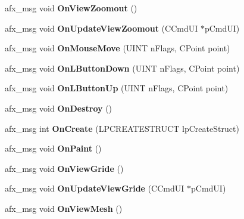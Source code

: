 \begin{DoxyCompactItemize}
afx\+\_\+msg void {\bfseries On\+View\+Zoomout} ()
\item 
\mbox{\label{class_work_view_a25b12d323ee4b426bba4b738d6b60cb8}} 
afx\+\_\+msg void {\bfseries On\+Update\+View\+Zoomout} (C\+Cmd\+UI $\ast$p\+Cmd\+UI)
\item 
\mbox{\label{class_work_view_a3408bfe423d38af42731966bc6b1b5f8}} 
afx\+\_\+msg void {\bfseries On\+Mouse\+Move} (U\+I\+NT n\+Flags, C\+Point point)
\item 
\mbox{\label{class_work_view_a251a6f512bd43f40a647517fb41eb68a}} 
afx\+\_\+msg void {\bfseries On\+L\+Button\+Down} (U\+I\+NT n\+Flags, C\+Point point)
\item 
\mbox{\label{class_work_view_ad66b49ccc4663eccbe9589a0754f9775}} 
afx\+\_\+msg void {\bfseries On\+L\+Button\+Up} (U\+I\+NT n\+Flags, C\+Point point)
\item 
\mbox{\label{class_work_view_aa7974658428c358313f8c5578c89665d}} 
afx\+\_\+msg void {\bfseries On\+Destroy} ()
\item 
\mbox{\label{class_work_view_affa363a468b358c178ab2feb5956c4e6}} 
afx\+\_\+msg int {\bfseries On\+Create} (L\+P\+C\+R\+E\+A\+T\+E\+S\+T\+R\+U\+CT lp\+Create\+Struct)
\item 
\mbox{\label{class_work_view_acf3b77c19540468ff5b385dc1d3a05d7}} 
afx\+\_\+msg void {\bfseries On\+Paint} ()
\item 
\mbox{\label{class_work_view_a4eaa90a69961395efbfeaa4773e0588f}} 
afx\+\_\+msg void {\bfseries On\+View\+Gride} ()
\item 
\mbox{\label{class_work_view_a86baee2b4009eea98833b3e98b352ae9}} 
afx\+\_\+msg void {\bfseries On\+Update\+View\+Gride} (C\+Cmd\+UI $\ast$p\+Cmd\+UI)
\item 
\mbox{\label{class_work_view_af3688036af8f371f405093e2f48fcc75}} 
afx\+\_\+msg void {\bfseries On\+View\+Mesh} ()
\item 
\mbox{\label{class_work_view_a9db7abfddac74a04efcf6a7249152965}} 

\end{DoxyCompactItemize}
